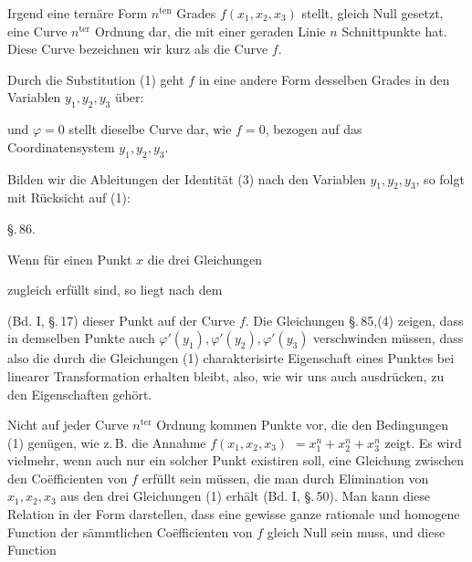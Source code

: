 Irgend eine ternäre Form $n^{\text{ten}}$ Grades $f(x_1, x_2, x_3)$ stellt,
gleich Null gesetzt, eine Curve $n^{\text{ter}}$ Ordnung dar, die mit einer
geraden Linie $n$ Schnittpunkte hat. Diese Curve bezeichnen wir
kurz als die Curve $f$.

Durch die Substitution (1) geht $f$ in eine andere Form desselben Grades in den Variablen $y_1, y_2, y_3$ über:


\noindent und $\varphi = 0$ stellt dieselbe Curve dar, wie $f = 0$, bezogen auf
das Coordinatensystem $y_1, y_2, y_3$.

Bilden wir die Ableitungen der Identität (3) nach den
Variablen $y_1, y_2, y_3$, so folgt mit Rücksicht auf (1):


\begin{center}
\S.\,86.

\end{center}

Wenn für einen Punkt $x$ die drei Gleichungen


\noindent zugleich erfüllt sind, so liegt nach dem 


\noindent (Bd. I, \S.\,17) dieser Punkt auf der Curve $f$. Die Gleichungen \S.\,85,(4)
zeigen, dass in demselben Punkte auch $\varphi'(y_1), \varphi'(y_2), \varphi'(y_3)$
verschwinden müssen, dass also die durch die Gleichungen (1)
charakterisirte Eigenschaft eines Punktes bei linearer Transformation erhalten bleibt, also, wie wir uns auch ausdrücken, zu
den  Eigenschaften gehört.

Nicht auf jeder Curve $n^{\text{ter}}$ Ordnung kommen Punkte vor, die
den Bedingungen (1) genügen, wie z.\,B. die Annahme $f(x_1, x_2, x_3)$
$= x_1^n + x_2^n + x_3^n$ zeigt. Es wird vielmehr, wenn auch nur ein
solcher Punkt existiren soll, eine Gleichung zwischen den Co\"efficienten von $f$ erfüllt sein müssen, die man durch Elimination
von $x_1, x_2, x_3$ aus den drei Gleichungen (1) erhält (Bd. I, \S.\,50).
Man kann diese Relation in der Form darstellen, dass eine
gewisse ganze rationale und homogene Function der sämmtlichen
Co\"efficienten von $f$ gleich Null sein muss, und diese Function
